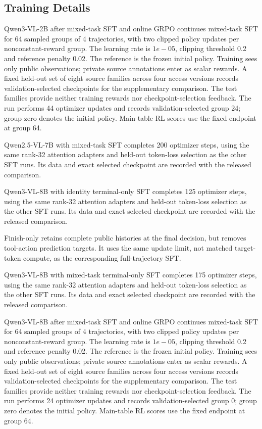 \subsection{Training Details}

Qwen3-VL-2B after mixed-task SFT and online GRPO continues mixed-task SFT for 64 sampled groups of 4 trajectories, with two clipped policy updates per nonconstant-reward group. The learning rate is \(1e-05\), clipping threshold 0.2 and reference penalty 0.02. The reference is the frozen initial policy. Training sees only public observations; private source annotations enter as scalar rewards. A fixed held-out set of eight source families across four access versions records validation-selected checkpoints for the supplementary comparison. The test families provide neither training rewards nor checkpoint-selection feedback. The run performs 44 optimizer updates and records validation-selected group 24; group zero denotes the initial policy. Main-table RL scores use the fixed endpoint at group 64.

Qwen2.5-VL-7B with mixed-task SFT completes 200 optimizer steps, using the same rank-32 attention adapters and held-out token-loss selection as the other SFT runs. Its data and exact selected checkpoint are recorded with the released comparison.

Qwen3-VL-8B with identity terminal-only SFT completes 125 optimizer steps, using the same rank-32 attention adapters and held-out token-loss selection as the other SFT runs. Its data and exact selected checkpoint are recorded with the released comparison.

Finish-only retains complete public histories at the final decision, but removes tool-action prediction targets. It uses the same update limit, not matched target-token compute, as the corresponding full-trajectory SFT.

Qwen3-VL-8B with mixed-task terminal-only SFT completes 175 optimizer steps, using the same rank-32 attention adapters and held-out token-loss selection as the other SFT runs. Its data and exact selected checkpoint are recorded with the released comparison.

Qwen3-VL-8B after mixed-task SFT and online GRPO continues mixed-task SFT for 64 sampled groups of 4 trajectories, with two clipped policy updates per nonconstant-reward group. The learning rate is \(1e-05\), clipping threshold 0.2 and reference penalty 0.02. The reference is the frozen initial policy. Training sees only public observations; private source annotations enter as scalar rewards. A fixed held-out set of eight source families across four access versions records validation-selected checkpoints for the supplementary comparison. The test families provide neither training rewards nor checkpoint-selection feedback. The run performs 24 optimizer updates and records validation-selected group 0; group zero denotes the initial policy. Main-table RL scores use the fixed endpoint at group 64.

